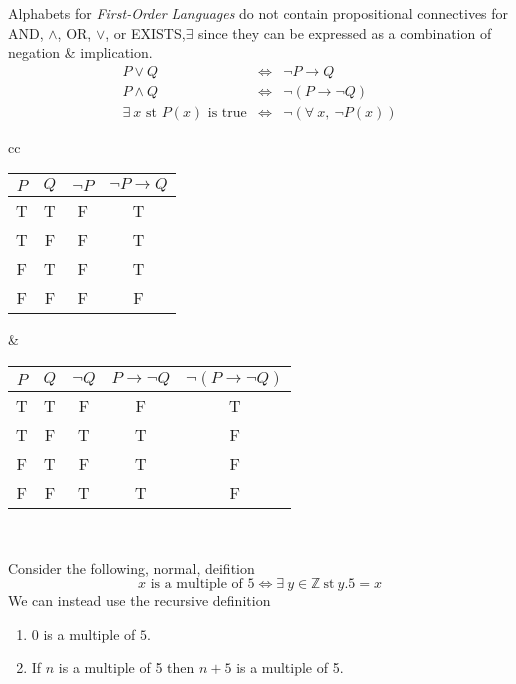 \documentclass[11pt,a4paper]{article}
\begin{document}
Alphabets for \textit{First-Order Languages} do not contain propositional connectives for AND, $\wedge$, OR, $\vee$, or EXISTS,$\exists$ since they can be expressed as a combination of negation \& implication.
\[\begin{array}{rcl}
P\vee Q&\Longleftrightarrow& \neg P\to Q\\P\wedge Q&\Longleftrightarrow&\neg(P\to\neg Q)\\
\exists\ x\text{ st }P(x)\text{ is true}&\Longleftrightarrow&\neg(\forall\ x,\ \neg P(x))
\end{array}\]
\begin{center}
\begin{tabular}{cc}
\begin{tabular}{cc|c|c}
$P$&$Q$&$\neg P$&$\neg P\to Q$\\\hline
T&T&F&T\\
T&F&F&T\\
F&T&F&T\\
F&F&F&F
\end{tabular}&
\begin{tabular}{cc|c|c|c}
$P$&$Q$&$\neg Q$&$P\to\neg Q$&$\neg(P\to\neg Q)$\\\hline
T&T&F&F&T\\
T&F&T&T&F\\
F&T&F&T&F\\
F&F&T&T&F
\end{tabular}
\end{tabular}\\
\end{center}

Consider the following, normal, deifition
$$x\text{ is a multiple of }5\Longleftrightarrow\exists\ y\in\mathbb{Z}\ \text{st}\ y.5=x$$
We can instead use the recursive definition
\begin{enumerate}
	\item $0$ is a multiple of $5$.
	\item If $n$ is a multiple of 5 then $n+5$ is a multiple of 5.
\end{enumerate}
\end{document}

